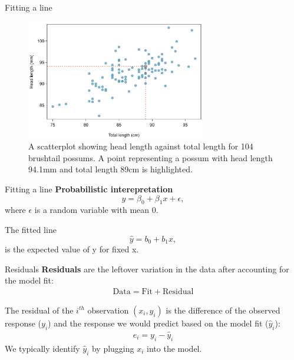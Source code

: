 \documentclass[12pt,a4paper]{beamer}
\begin{document}
	\begin{frame}{Fitting a line}
		\begin{figure}
		   \centering
		   \includegraphics[width=0.7\textwidth]{figures/scattHeadLTotalL/scattHeadLTotalL}
		   \caption{\small A scatterplot showing head length against total length for 104 brushtail possums. A point representing a possum with head length 94.1mm and total length 89cm is highlighted.}
		   \label{scattHeadLTotalL}
		\end{figure}
	\end{frame}
	\begin{frame}{Fitting a line}
		\textbf{Probabilistic interepretation}\\
		\[y=\beta_0+\beta_1x+\epsilon,\]
		where $\epsilon$ is a random variable with mean 0.
	
	The fitted line
	\[\hat{y}=b_0+b_1x,\]
	 is the expected value of y  for fixed x.
	 \end{frame}
	\begin{frame}{Residuals}
		\textbf{Residuals} are the leftover variation in the data after accounting for the model fit:
		\begin{align*}
		\text{Data} = \text{Fit} + \text{Residual}
		\end{align*}
		\begin{framed}
			The residual of the $i^{th}$ observation $(x_i, y_i)$ is the difference of the observed response ($y_i$) and the response we would predict based on the model fit ($\hat{y}_i$):
			\begin{eqnarray*}
			e_i = y_i - \hat{y}_i
			\end{eqnarray*}
			We typically identify $\hat{y}_i$ by plugging $x_i$ into the model.
		\end{framed}
	\end{frame}
\end{document}
